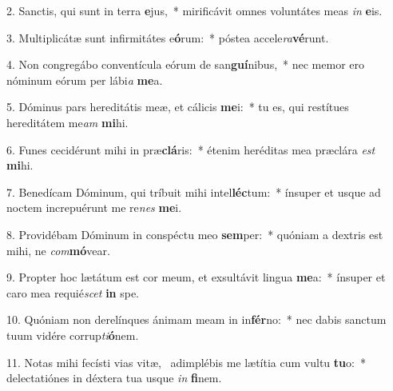 2. Sanctis, qui sunt in terra \textbf{e}jus,~*  mirificávit omnes voluntátes meas \textit{in} \textbf{e}is.\

3. Multiplicátæ sunt infirmitátes e\textbf{ó}rum:~*  póstea accele\textit{ra}\textbf{vé}runt.\

4. Non congregábo conventícula eórum de san\textbf{guí}nibus,~*  nec memor ero nóminum eórum per lábi\textit{a} \textbf{me}a.\

5. Dóminus pars hereditátis meæ, et cálicis \textbf{me}i:~*  tu es, qui restítues hereditátem me\textit{am} \textbf{mi}hi.\

6. Funes cecidérunt mihi in præ\textbf{clá}ris:~*  étenim heréditas mea præclára \textit{est} \textbf{mi}hi.\

7. Benedícam Dóminum, qui tríbuit mihi intel\textbf{léc}tum:~*  ínsuper et usque ad noctem increpuérunt me re\textit{nes} \textbf{me}i.\

8. Providébam Dóminum in conspéctu meo \textbf{sem}per:~*  quóniam a dextris est mihi, ne \textit{com}\textbf{mó}vear.\

9. Propter hoc lætátum est cor meum, et exsultávit lingua \textbf{me}a:~*  ínsuper et caro mea requié\textit{scet} \textbf{in} spe.\

10. Quóniam non derelínques ánimam meam in in\textbf{fér}no:~*  nec dabis sanctum tuum vidére corrup\textit{ti}\textbf{ó}nem.\

11. Notas mihi fecísti vias vitæ, \dag\  adimplébis me lætítia cum vultu \textbf{tu}o:~*  delectatiónes in déxtera tua usque \textit{in} \textbf{fi}nem.\

